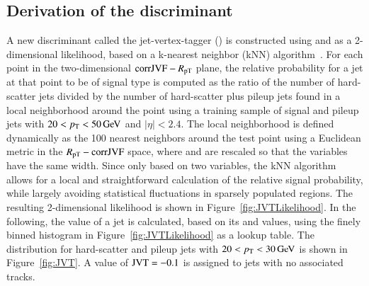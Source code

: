 \documentclass{atlasnote}
\begin{document}
\subsection{Derivation of the discriminant}
A new discriminant called the jet-vertex-tagger (\JVT) is constructed using \RpT and \cJVF as a 2-dimensional 
likelihood, based on a k-nearest neighbor (kNN) algorithm~\cite{Hocker:2007ht}. 
For each point in the two-dimensional ${\rm corrJVF}-R_\mathrm{pT}$ plane, the relative probability for a jet at that point to be of signal 
type is computed as the ratio of the number of hard-scatter jets divided by the number of hard-scatter plus pileup jets found in 
a local neighborhood around the point using a training sample of signal and pileup jets with $20 < p_{\mathrm{T}} < 50\,\text{Ge\hspace{-.08em}V}$ and $|\eta| < 2.4$. 
The local neighborhood is defined dynamically as the 100 nearest neighbors around the test point using a Euclidean metric in the $R_\mathrm{pT}-{\rm corrJVF}$ space, where
\cJVF and \RpT are rescaled so that the variables have the same width. 
Since only based on two variables, the kNN algorithm allows for a local and straightforward calculation of the relative signal probability, 
while largely avoiding statistical fluctuations in sparsely populated regions. The resulting 2-dimensional \JVT likelihood is shown 
in Figure~\ref{fig:JVTLikelihood}.
In the following, the \JVT value of a jet is calculated, based on its \cJVF and \RpT values, using the finely binned histogram in Figure~\ref{fig:JVTLikelihood} as a lookup table.
The \JVT distribution for hard-scatter and pileup jets  with $20 < p_{\mathrm{T}} < 30\,\text{Ge\hspace{-.08em}V}$ is shown in Figure~\ref{fig:JVT}. 
A value of ${\rm JVT}=-0.1$ is assigned to jets with no associated tracks. 
\end{document}
